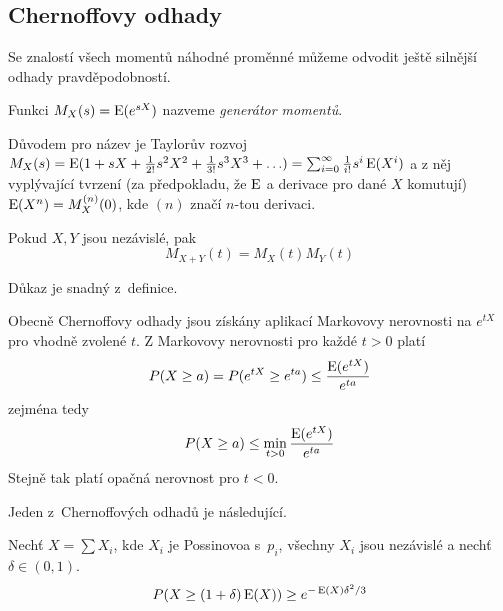 \subsection{Chernoffovy odhady}


Se znalostí všech momentů náhodné proměnné můžeme odvodit ještě silnější
odhady pravděpodobností.

\begin{definition}
    Funkci $M_X(s) = \operatorname{E}(e^{s X})$ nazveme {\em generátor momentů}.
\end{definition}

Důvodem pro název je Taylorův rozvoj
$M_X(s)
= \operatorname{E}( 1 + sX + \frac{1}{2!}s^2 X^2 + \frac{1}{3!}s^3 X^3 + \ldots )
= \sum_{i = 0}^{\infty} \frac{1}{i!} s^i \operatorname{E} (X^i)$
a z něj vyplývající tvrzení (za předpokladu, že $\operatorname{E}$ a derivace
pro dané $X$ komutují) $\operatorname{E}(X^n) = M^{(n)}_X(0)$, kde $(n)$ značí $n$-tou
derivaci.

\begin{theorem}
    Pokud $X, Y$ jsou nezávislé, pak
    \[
        M_{X+Y}(t) = M_X(t) M_Y(t)
    \]
\end{theorem}

Důkaz je snadný z~definice.

Obecně Chernoffovy odhady jsou získány aplikací Markovovy nerovnosti na
$e^{tX}$ pro vhodně zvolené $t$. Z Markovovy nerovnosti pro každé $t >
0$ platí
\[
    P(X \geq a) = P(e^{tX} \geq e^{ta}) \leq \frac{\operatorname{E}(e^{tX})}{e^{ta}}
\]
zejména tedy
\[
    P(X \geq a) \leq \min_{t > 0} \frac{\operatorname{E}(e^{tX})}{e^{ta}}
\]
Stejně tak platí opačná nerovnost pro $t < 0$.


Jeden z~Chernoffových odhadů je následující.

\begin{theorem}
    Nechť $X = \sum X_i$, kde $X_i$ je Possinovoa s~$p_i$,
    všechny $X_i$ jsou nezávislé a nechť $\delta \in (0,1)$.
    \[
        P(X \geq (1 + \delta) \operatorname{E}(X)) \geq e^{- \operatorname{E}(X) \delta^2 / 3}
    \]
\end{theorem}

